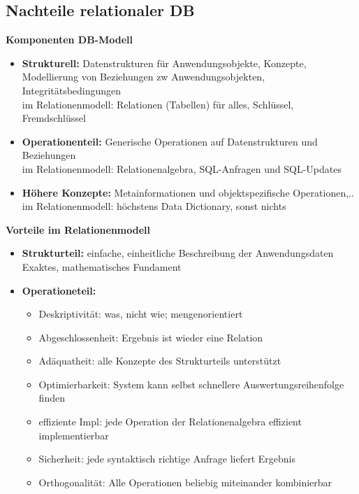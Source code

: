 \subsection{Nachteile relationaler DB}
\textbf{Komponenten DB-Modell}
\begin{itemize}
	\item \textbf{Strukturell:} Datenstrukturen für Anwendungsobjekte, Konzepte, Modellierung von Beziehungen zw Anwendungsobjekten, Integritätsbedingungen\\
	im Relationenmodell: Relationen (Tabellen) für alles, Schlüssel, Fremdschlüssel
	
	\item \textbf{Operationenteil:} Generische Operationen auf Datenstrukturen und Beziehungen\\
	im Relationenmodell: Relationenalgebra, SQL-Anfragen und SQL-Updates
	
	\item \textbf{Höhere Konzepte:} Metainformationen und objektspezifische Operationen,..\\
	im Relationenmodell: höchstens Data Dictionary, sonst nichts
\end{itemize}

\textbf{Vorteile im Relationenmodell}
\begin{itemize}
	\item \textbf{Strukturteil:} einfache, einheitliche Beschreibung der Anwendungsdaten\\
	Exaktes, mathematisches Fundament
	
	\item \textbf{Operationeteil:}
	\begin{itemize}
		\item Deskriptivität: was, nicht wie; mengenorientiert
		\item Abgeschlossenheit: Ergebnis ist wieder eine Relation
		\item Adäquatheit: alle Konzepte des Strukturteils unterstützt
		\item Optimierbarkeit: System kann selbst schnellere Auswertungsreihenfolge finden
		\item effiziente Impl: jede Operation der Relationenalgebra effizient implementierbar
		\item  Sicherheit: jede syntaktisch richtige Anfrage liefert Ergebnis
		\item Orthogonalität: Alle Operationen beliebig miteinander kombinierbar
	\end{itemize}
\end{itemize}

